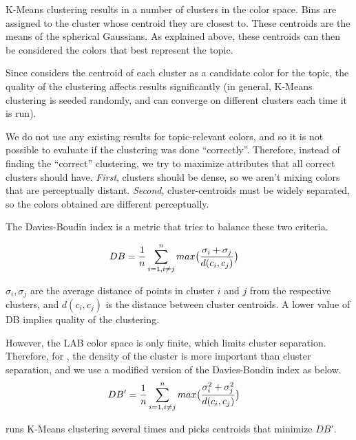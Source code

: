 K-Means clustering results in a number of clusters in the color space. Bins are assigned to the cluster whose centroid they are closest to. These centroids are the means of the spherical Gaussians. As explained above, these centroids can then be considered the colors that best represent the topic.

Since \system considers the centroid of each cluster as a candidate color for the topic, the quality of the clustering affects results significantly (in general, K-Means clustering is seeded randomly, and can converge on different clusters each time it is run).

We do not use any existing results for topic-relevant colors, and so it is not possible to evaluate if the clustering was done ``correctly''. Therefore, instead of finding the ``correct'' clustering, we try to maximize attributes that all correct clusters should have. {\em First}, clusters should be dense, so we aren't mixing colors that are perceptually distant. {\em Second}, cluster-centroids must be widely separated, so the colors obtained are different perceptually.

The Davies-Boudin index is a metric that tries to balance these two criteria. 

\begin{align}
DB &= \frac{1}{n} \sum_{i=1, i \neq j}^{n}max\big{(}\frac{\sigma_{i} + \sigma_{j}}{d(c_{i}, c_{j})}\big{)}
\end{align}

$\sigma_{i}, \sigma_{j}$ are the average distance of points in cluster $i$ and $j$ from the respective clusters, and $d(c_{i}, c_{j})$ is the distance between cluster centroids. A lower value of DB implies quality of the clustering.

However, the LAB color space is only finite, which limits cluster separation. Therefore, for \system, the density of the cluster is more important than cluster separation, and we use a modified version of the Davies-Boudin index as below.
\begin{align}
DB' &= \frac{1}{n} \sum_{i=1, i \neq j}^{n}max\big{(}\frac{\sigma_{i}^{2} + \sigma_{j}^{2}}{d(c_{i}, c_{j})}\big{)}
\end{align}

\system runs K-Means clustering several times and picks centroids that minimize $DB'$. 